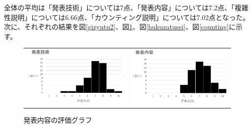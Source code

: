 全体の平均は「発表技術」については7点、「発表内容」については7.2点、「複雑性説明」については6.66点、「カウンティング説明」については7.02点となった。
次に、それぞれの結果を図\ref{gizyutu2}、図\ref{naiyou2}、図\ref{hukuzatusei}、図\ref{counting}に示す。

\begin{figure}[h]
 \begin{tabular}{cc}
  \begin{minipage}[h]{0.45\hsize}
  \centering
 \includegraphics[width=0.7\linewidth]{./figure/gizyutu2.jpg}
\caption{発表技術の評価グラフ}
\label{gizyutu2}
 \end{minipage} &

\begin{minipage}[h]{0.45\hsize}
  \centering
 \includegraphics[width=0.7\linewidth]{./figure/naiyou2.jpg}
 \caption{発表内容の評価グラフ}
\label{naiyou2}
\end{minipage} 
\end{tabular}
\end{figure}

